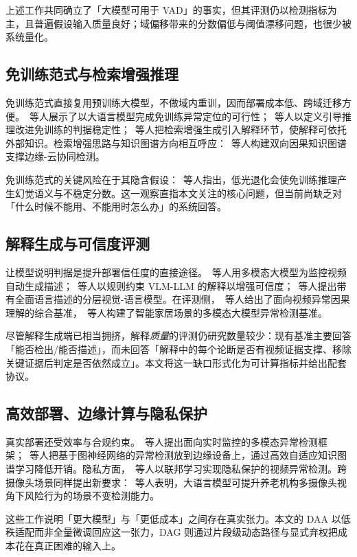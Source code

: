 上述工作共同确立了「大模型可用于 VAD」的事实，但其评测仍以检测指标为主，且普遍假设输入质量良好；域偏移带来的分数偏低与阈值漂移问题，也很少被系统量化。

\subsection{免训练范式与检索增强推理}

免训练范式直接复用预训练大模型，不做域内重训，因而部署成本低、跨域迁移方便。\citeauthor{zanella2024trainingfree}~等人展示了以大语言模型完成免训练异常定位的可行性\cite{zanella2024trainingfree}；\citeauthor{pei2026drvad}~等人以定义引导推理改进免训练的判据稳定性\cite{pei2026drvad}；\citeauthor{sun2026rag4vad}~等人把检索增强生成引入解释环节，使解释可依托外部知识\cite{sun2026rag4vad}。检索增强思路与知识图谱方向相互呼应：\citeauthor{wang2025holotrace}~等人构建双向因果知识图谱支撑边缘-云协同检测\cite{wang2025holotrace}。

免训练范式的关键风险在于其隐含假设：\citeauthor{mo2026lowlight}~等人指出，低光退化会使免训练推理产生幻觉语义与不稳定分数\cite{mo2026lowlight}。这一观察直指本文关注的核心问题，但当前尚缺乏对「什么时候不能用、不能用时怎么办」的系统回答。

\subsection{解释生成与可信度评测}

让模型说明判据是提升部署信任度的直接途径。\citeauthor{hashimoto2025caption}~等人用多模态大模型为监控视频自动生成描述\cite{hashimoto2025caption}；\citeauthor{khedher2025trustworthy}~等人以规则约束 VLM-LLM 的解释以增强可信度\cite{khedher2025trustworthy}；\citeauthor{alradi2026hierarchical}~等人提出带有全面语言描述的分层视觉-语言模型\cite{alradi2026hierarchical}。在评测侧，\citeauthor{du2024causation}~等人给出了面向视频异常因果理解的综合基准\cite{du2024causation}，\citeauthor{zhao2025smarthomebench}~等人构建了智能家居场景的多模态大模型异常检测基准\cite{zhao2025smarthomebench}。

尽管解释生成端已相当拥挤，解释\emph{质量}的评测仍研究数量较少：现有基准主要回答「能否检出/能否描述」，而未回答「解释中的每个论断是否有视频证据支撑、移除关键证据后判定是否依然成立」。本文将这一缺口形式化为可计算指标并给出配套协议。

\subsection{高效部署、边缘计算与隐私保护}

真实部署还受效率与合规约束。\citeauthor{phan2025aadcnet}~等人提出面向实时监控的多模态异常检测框架\cite{phan2025aadcnet}；\citeauthor{yun2025edgegnn}~等人把基于图神经网络的异常检测放到边缘设备上，通过高效自适应知识图谱学习降低开销\cite{yun2025edgegnn}。隐私方面，\citeauthor{li2026federated}~等人以联邦学习实现隐私保护的视频异常检测\cite{li2026federated}。跨摄像头场景同样提出新要求：\citeauthor{mishra2026dementia}~等人表明，大语言模型可提升养老机构多摄像头视角下风险行为的场景不变检测能力\cite{mishra2026dementia}。

这些工作说明「更大模型」与「更低成本」之间存在真实张力。本文的 DAA 以低秩适配而非全量微调回应这一张力，DAG 则通过片段级动态路径与显式弃权把成本花在真正困难的输入上。
